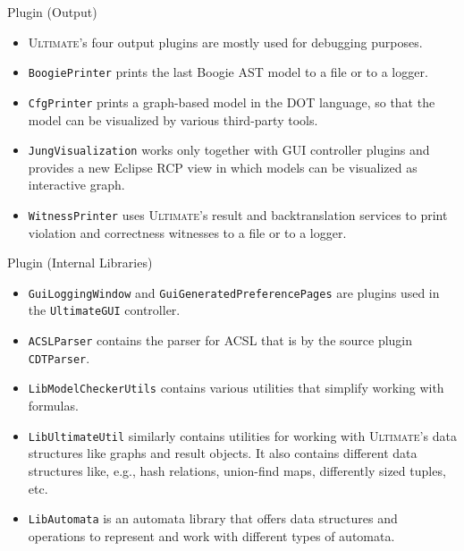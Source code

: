 \documentclass[12pt]{beamer}
\newcommand{\code}[1]{\texttt{#1}}
\newcommand{\ultimates}{\textsc{Ultimate}'s }
\begin{document}
\begin{frame}{Plugin (Output)}
	\begin{itemize}
		\item \ultimates four output plugins are mostly used for debugging purposes.
		\item \code{BoogiePrinter} prints the last Boogie AST model to a file or to a logger.
		\item \code{CfgPrinter} prints a graph-based model in the DOT language, so that the model can be visualized by various third-party tools.
		\item \code{JungVisualization} works only together with GUI controller plugins and provides a new Eclipse RCP view in which models can be visualized as interactive graph. 
		\item \code{WitnessPrinter} uses \ultimates result and backtranslation services to print violation and correctness witnesses to a file or to a logger.
	\end{itemize}
\end{frame}

\begin{frame}{Plugin (Internal Libraries)}
	\begin{itemize}
		\item \code{GuiLoggingWindow} and \code{GuiGeneratedPreferencePages} are plugins used in the \code{UltimateGUI} controller.
		\item \code{ACSLParser} contains the parser for ACSL that is by the source plugin \code{CDTParser}.
		\item \code{LibModelCheckerUtils} contains various utilities that simplify working with formulas.
		\item \code{LibUltimateUtil} similarly contains utilities for working with \ultimates data structures like graphs and result objects. It also contains different data structures like, e.g., hash relations, union-find maps, differently sized tuples, etc.
		\item \code{LibAutomata} is an automata library that offers data structures and operations to represent and work with different types of automata.
	\end{itemize}
\end{frame}

\end{document}
